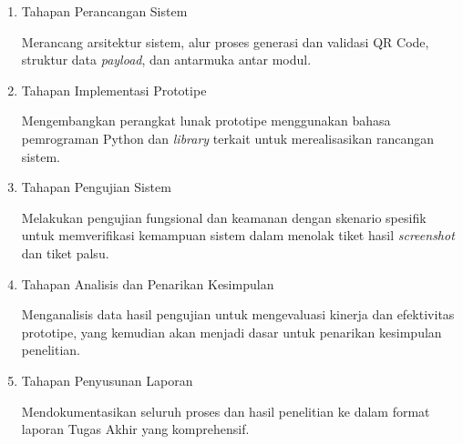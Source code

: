 \begin{enumerate}
\item Tahapan Perancangan Sistem    

Merancang arsitektur sistem, alur proses generasi dan validasi QR Code, struktur data \textit{payload}, dan antarmuka antar modul.

\item Tahapan Implementasi Prototipe
    
Mengembangkan perangkat lunak prototipe menggunakan bahasa pemrograman Python dan \textit{library} terkait untuk merealisasikan rancangan sistem.

\item Tahapan Pengujian Sistem
    
Melakukan pengujian fungsional dan keamanan dengan skenario spesifik untuk memverifikasi kemampuan sistem dalam menolak tiket hasil \textit{screenshot} dan tiket palsu.

\item Tahapan Analisis dan Penarikan Kesimpulan
    
Menganalisis data hasil pengujian untuk mengevaluasi kinerja dan efektivitas prototipe, yang kemudian akan menjadi dasar untuk penarikan kesimpulan penelitian.
    
\item Tahapan Penyusunan Laporan

Mendokumentasikan seluruh proses dan hasil penelitian ke dalam format laporan Tugas Akhir yang komprehensif.

\end{enumerate}